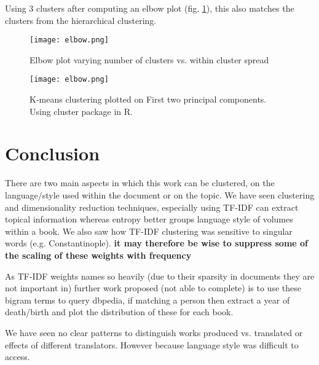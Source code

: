 \documentclass[a4paper,10pt, twocolumn]{article}
\begin{document}
Using 3 clusters after computing an elbow plot (fig. \ref{fig:elbow}), this also matches the clusters from the hierarchical clustering. 



\begin{figure}
	\texttt{[image: elbow.png]}
	\centering
	\caption{Elbow plot varying number of clusters vs. within cluster spread}
	\label{fig:elbow}
\end{figure}



\begin{figure}
	\texttt{[image: elbow.png]}
	\centering
	\caption{K-means clustering plotted on First two principal components. Using cluster package in R. }
	\label{fig:kmeans}
\end{figure} 
 
\section{Conclusion}
There are two main aspects in which this work can be clustered, on the language/style used within the document or on the topic. We have seen clustering and dimensionality reduction techniques, especially using TF-IDF can extract topical information whereas entropy better groups language style of volumes within a book. We also saw how TF-IDF clustering was sensitive to singular words (e.g. Constantinople). \textbf{it may therefore be wise to suppress some of the scaling of these weights with frequency}

As TF-IDF weights names so heavily (due to their sparsity in documents they are not important in) further work proposed (not able to complete) is to use these bigram terms to query dbpedia, if matching a person then extract a year of death/birth and plot the distribution of these for each book.

We have seen no clear patterns to distinguish works produced vs. translated or effects of different translators. However because language style was difficult to access. 


\end{document}
